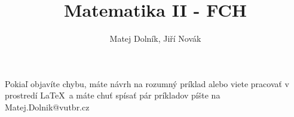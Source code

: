 \author{Matej Dolník, Jiří Novák}
\title{Matematika II - FCH}
\maketitle
Pokiaľ objavíte chybu, máte návrh na rozumný príklad alebo viete pracovať v prostredí \LaTeX~a máte chuť spísať pár príkladov píšte na \newline Matej.Dolnik@vutbr.cz 
